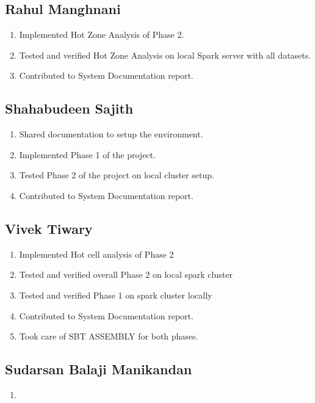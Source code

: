 \subsection{Rahul Manghnani}
\begin{enumerate}
    \item Implemented Hot Zone Analysis of Phase 2.
		\item Tested and verified Hot Zone Analysis on local Spark server with all datasets.
		\item Contributed to System Documentation report.
\end{enumerate}

\subsection{Shahabudeen Sajith}
\begin{enumerate}
    \item Shared documentation to setup the environment.
    \item Implemented Phase 1 of the project.
    \item Tested Phase 2 of the project on local cluster setup.
    \item Contributed to System Documentation report.
\end{enumerate}

\subsection{Vivek Tiwary}
\begin{enumerate}
    \item Implemented Hot cell analysis of Phase 2
    \item Tested and verified overall Phase 2 on local spark cluster
    \item Tested and verified Phase 1 on spark cluster locally
    \item Contributed to System Documentation report.
    \item Took care of SBT ASSEMBLY for both phases.
\end{enumerate}

\subsection{Sudarsan Balaji Manikandan}
\begin{enumerate}
    \item 
\end{enumerate}



\newpage



